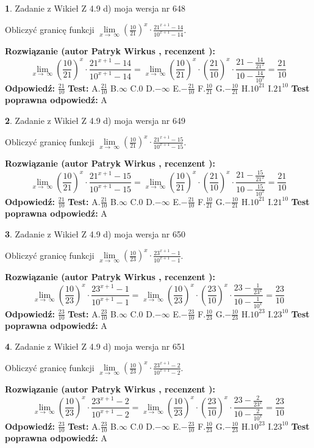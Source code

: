 \documentclass[12pt, a4paper]{article}
\theoremstyle{definition} %
\newtheorem{zad}{}
\newcommand{\zadStart}[1]{\begin{zad}#1\newline}
\newcommand{\zadStop}{\end{zad}}
\newcommand{\rozwStart}[2]{\noindent \textbf{Rozwiązanie (autor #1 , recenzent #2): }\newline}
\newcommand{\rozwStop}{\newline}
\newcommand{\odpStart}{\noindent \textbf{Odpowiedź:}\newline}
\newcommand{\odpStop}{\newline}
\newcommand{\testStart}{\noindent \textbf{Test:}\newline}
\newcommand{\testStop}{\newline}
\newcommand{\kluczStart}{\noindent \textbf{Test poprawna odpowiedź:}\newline}
\newcommand{\kluczStop}{\newline}
\begin{document}
\zadStart{Zadanie z Wikieł Z 4.9 d) moja wersja nr 648}


Obliczyć granicę funkcji  $\lim\limits_{x\to\ \infty}(\frac{10}{21})^{x}\cdot\frac{21^{x+1}-14}{10^{x+1}-14}$.
\zadStop
\rozwStart{Patryk Wirkus}{}
$$\lim\limits_{x\to\ \infty}(\frac{10}{21})^{x}\cdot\frac{21^{x+1}-14}{10^{x+1}-14}=\lim\limits_{x\to\ \infty}(\frac{10}{21})^{x}\cdot(\frac{21}{10})^{x} \cdot \frac{21-\frac{14}{21^{x}}}{10-\frac{14}{10^{x}}} = \frac{21}{10}$$
\rozwStop
\odpStart
$\frac{21}{10}$
\odpStop
\testStart
A.$\frac{21}{10}$ B.$\infty$ C.$0$ D.$-\infty$ E.$-\frac{21}{10}$
F.$\frac{10}{21}$ G.$-\frac{10}{21}$
H.$10^{21}$
I.$21^{10}$
\testStop
\kluczStart
A
\kluczStop



\zadStart{Zadanie z Wikieł Z 4.9 d) moja wersja nr 649}


Obliczyć granicę funkcji  $\lim\limits_{x\to\ \infty}(\frac{10}{21})^{x}\cdot\frac{21^{x+1}-15}{10^{x+1}-15}$.
\zadStop
\rozwStart{Patryk Wirkus}{}
$$\lim\limits_{x\to\ \infty}(\frac{10}{21})^{x}\cdot\frac{21^{x+1}-15}{10^{x+1}-15}=\lim\limits_{x\to\ \infty}(\frac{10}{21})^{x}\cdot(\frac{21}{10})^{x} \cdot \frac{21-\frac{15}{21^{x}}}{10-\frac{15}{10^{x}}} = \frac{21}{10}$$
\rozwStop
\odpStart
$\frac{21}{10}$
\odpStop
\testStart
A.$\frac{21}{10}$ B.$\infty$ C.$0$ D.$-\infty$ E.$-\frac{21}{10}$
F.$\frac{10}{21}$ G.$-\frac{10}{21}$
H.$10^{21}$
I.$21^{10}$
\testStop
\kluczStart
A
\kluczStop



\zadStart{Zadanie z Wikieł Z 4.9 d) moja wersja nr 650}


Obliczyć granicę funkcji  $\lim\limits_{x\to\ \infty}(\frac{10}{23})^{x}\cdot\frac{23^{x+1}-1}{10^{x+1}-1}$.
\zadStop
\rozwStart{Patryk Wirkus}{}
$$\lim\limits_{x\to\ \infty}(\frac{10}{23})^{x}\cdot\frac{23^{x+1}-1}{10^{x+1}-1}=\lim\limits_{x\to\ \infty}(\frac{10}{23})^{x}\cdot(\frac{23}{10})^{x} \cdot \frac{23-\frac{1}{23^{x}}}{10-\frac{1}{10^{x}}} = \frac{23}{10}$$
\rozwStop
\odpStart
$\frac{23}{10}$
\odpStop
\testStart
A.$\frac{23}{10}$ B.$\infty$ C.$0$ D.$-\infty$ E.$-\frac{23}{10}$
F.$\frac{10}{23}$ G.$-\frac{10}{23}$
H.$10^{23}$
I.$23^{10}$
\testStop
\kluczStart
A
\kluczStop



\zadStart{Zadanie z Wikieł Z 4.9 d) moja wersja nr 651}


Obliczyć granicę funkcji  $\lim\limits_{x\to\ \infty}(\frac{10}{23})^{x}\cdot\frac{23^{x+1}-2}{10^{x+1}-2}$.
\zadStop
\rozwStart{Patryk Wirkus}{}
$$\lim\limits_{x\to\ \infty}(\frac{10}{23})^{x}\cdot\frac{23^{x+1}-2}{10^{x+1}-2}=\lim\limits_{x\to\ \infty}(\frac{10}{23})^{x}\cdot(\frac{23}{10})^{x} \cdot \frac{23-\frac{2}{23^{x}}}{10-\frac{2}{10^{x}}} = \frac{23}{10}$$
\rozwStop
\odpStart
$\frac{23}{10}$
\odpStop
\testStart
A.$\frac{23}{10}$ B.$\infty$ C.$0$ D.$-\infty$ E.$-\frac{23}{10}$
F.$\frac{10}{23}$ G.$-\frac{10}{23}$
H.$10^{23}$
I.$23^{10}$
\testStop
\kluczStart
A
\kluczStop
\end{document}
